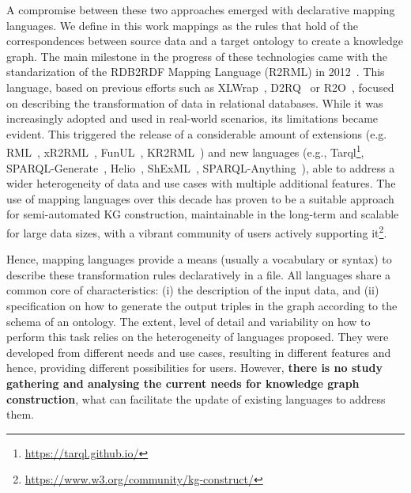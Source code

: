 A compromise between these two approaches emerged with declarative mapping languages. We define in this work mappings as the rules that hold of the correspondences between source data and a target ontology to create a knowledge graph. The main milestone in the progress of these technologies came with the standarization of the RDB2RDF Mapping Language (R2RML) in 2012~\citep{das2012r2rml}. This language, based on previous efforts such as XLWrap~\citep{xlwrap}, D2RQ~\citep{bizer2004d2rq} or R2O~\citep{barrasa2004r2o}, focused on describing the transformation of data in relational databases. While it was increasingly adopted and used in real-world scenarios, its limitations became evident. This triggered the release of a considerable amount of extensions (e.g. RML~\citep{Dimou2014rml}, xR2RML~\citep{michel2015xr2rml}, FunUL~\citep{junior2016funul}, KR2RML~\citep{slepicka2015kr2rml}) and new languages (e.g., Tarql\footnote{\url{https://tarql.github.io/}}, SPARQL-Generate~\citep{Lefrancois2017sparqlgenerate}, Helio~\citep{cimmino2022helio}, ShExML~\citep{Garcia-Gonzalez2020shexml}, SPARQL-Anything~\citep{asprino2023sparql-anything}), able to address a wider heterogeneity of data and use cases with multiple additional features. The use of mapping languages over this decade has proven to be a suitable approach for semi-automated KG construction, maintainable in the long-term and scalable for large data sizes, with a vibrant community of users actively supporting it\footnote{\url{https://www.w3.org/community/kg-construct/}}. 


 Hence, mapping languages provide a means (usually a vocabulary or syntax) to describe these transformation rules declaratively in a file. All languages share a common core of characteristics: (i) the description of the input data, and (ii) specification on how to generate the output triples in the graph according to the schema of an ontology. The extent, level of detail and variability on how to perform this task relies on the heterogeneity of languages proposed. They were developed from different needs and use cases, resulting in different features and hence, providing different possibilities for users. However, \textbf{there is no study gathering and analysing the current needs for knowledge graph construction}, what can facilitate the update of existing languages to address them. 


